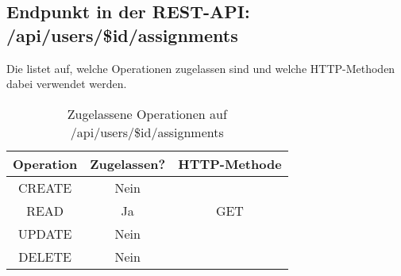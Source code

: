 \subsection{Endpunkt in der REST-API: /api/users/\$id/assignments}
Die  listet auf, welche Operationen zugelassen sind und welche HTTP-Methoden dabei verwendet werden. 

\begin{table}[!htbp]
	\begin{tabular}{|c|c|c|}
		\hline
			\textbf{Operation} & \textbf{Zugelassen?} & \textbf{HTTP-Methode} \\ \hline
			CREATE & Nein &  \\ \hline 
			READ & Ja & GET \\ \hline
			UPDATE & Nein & \\ \hline 
			DELETE & Nein & \\ \hline
	\end{tabular}

		\caption{Zugelassene Operationen auf /api/users/\$id/assignments}
		\label{tab:rest:api:users:id:assignments:meth}
\end{table}

